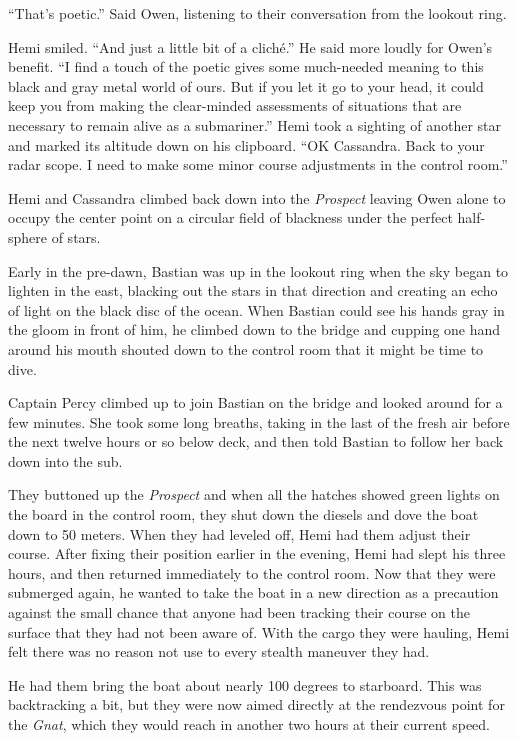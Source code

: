 \documentclass[]{scrbook}
\begin{document}
``That's poetic.'' Said Owen, listening to their conversation from the
lookout ring.

Hemi smiled. ``And just a little bit of a cliché.'' He said more loudly
for Owen's benefit. ``I find a touch of the poetic gives some
much-needed meaning to this black and gray metal world of ours. But if
you let it go to your head, it could keep you from making the
clear-minded assessments of situations that are necessary to remain
alive as a submariner.'' Hemi took a sighting of another star and marked
its altitude down on his clipboard. ``OK Cassandra. Back to your radar
scope. I need to make some minor course adjustments in the control
room.''

Hemi and Cassandra climbed back down into the \emph{Prospect} leaving
Owen alone to occupy the center point on a circular field of blackness
under the perfect half-sphere of stars.

Early in the pre-dawn, Bastian was up in the lookout ring when the sky
began to lighten in the east, blacking out the stars in that direction
and creating an echo of light on the black disc of the ocean. When
Bastian could see his hands gray in the gloom in front of him, he
climbed down to the bridge and cupping one hand around his mouth shouted
down to the control room that it might be time to dive.

Captain Percy climbed up to join Bastian on the bridge and looked around
for a few minutes. She took some long breaths, taking in the last of the
fresh air before the next twelve hours or so below deck, and then told
Bastian to follow her back down into the sub.

They buttoned up the \emph{Prospect} and when all the hatches showed
green lights on the board in the control room, they shut down the
diesels and dove the boat down to 50 meters. When they had leveled off,
Hemi had them adjust their course. After fixing their position earlier
in the evening, Hemi had slept his three hours, and then returned
immediately to the control room. Now that they were submerged again, he
wanted to take the boat in a new direction as a precaution against the
small chance that anyone had been tracking their course on the surface
that they had not been aware of. With the cargo they were hauling, Hemi
felt there was no reason not use to every stealth maneuver they had.

He had them bring the boat about nearly 100 degrees to starboard. This
was backtracking a bit, but they were now aimed directly at the
rendezvous point for the \emph{Gnat}, which they would reach in another
two hours at their current speed.
\end{document}
